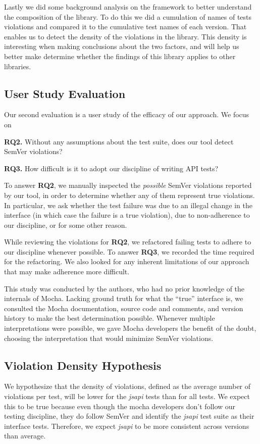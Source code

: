 Lastly we did some background analysis on the framework to better
understand the composition of the library. To do this we did a
cumulation of names of tests violations and compared it to the
cumulative test names of each version.  That enables us to detect the
density of the violations in the library. This density is interesting
when making conclusions about the two factors, and will help us better
make determine whether the findings of this library applies to other 
libraries.

\subsection{User Study Evaluation}
Our second evaluation is a user study of the efficacy of our
approach. We focus on 

{\bf RQ2.} Without any assumptions about the test suite, does our tool
detect SemVer violations?

{\bf RQ3.} How difficult is it to adopt our discipline of writing API
tests?

To answer {\bf RQ2}, we manually inspected the {\em possible\/} SemVer
violations reported by our tool, in order to determine whether any of
them represent true violations. In particular, we ask whether the test
failure was due to an illegal change in the interface (in which case
the failure is a true violation), due to non-adherence to our
discipline, or for some other reason.

While reviewing the violations for {\bf RQ2}, we refactored failing
tests to adhere to our discipline whenever possible. To answer {\bf
  RQ3}, we recorded the time required for the refactoring. We also
looked for any inherent limitations of our approach that may make
adherence more difficult.

This study was conducted by the authors, who had no prior knowledge of
the internals of Mocha. Lacking ground truth for what the ``true''
interface is, we consulted the Mocha documentation, source code and
comments, and version history to make the best determination
possible. Whenever multiple interpretations were possible, we gave
Mocha developers the benefit of the doubt, choosing the interpretation
that would minimize SemVer violations.


\subsection{Violation Density Hypothesis}
We hypothesize that the density of violations, defined as the average
number of violations per test, will be lower for the {\em jsapi} tests
than for all tests. We expect this to be true because even though the
mocha developers don't follow our testing discipline, they do follow
SemVer and identify the {\em jsapi} test suite as their interface
tests. Therefore, we expect {\em jsapi} to be more consistent across
versions than average.

